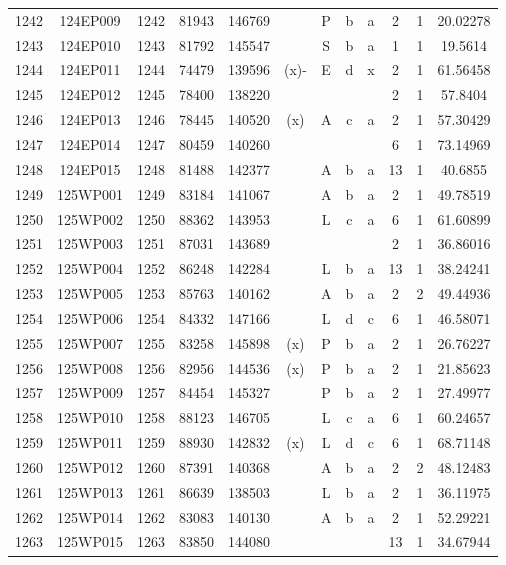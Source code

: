 \begin{tabular}{|*{12}{c|}}
1242 & 124EP009 & 1242 & 81943 & 146769 &  & P & b & a & 2 & 1 & 20.02278 \\ 
1243 & 124EP010 & 1243 & 81792 & 145547 &  & S & b & a & 1 & 1 & 19.5614 \\ 
1244 & 124EP011 & 1244 & 74479 & 139596 & (x)- & E & d & x & 2 & 1 & 61.56458 \\ 
1245 & 124EP012 & 1245 & 78400 & 138220 &  &  &  &  & 2 & 1 & 57.8404 \\ 
1246 & 124EP013 & 1246 & 78445 & 140520 & (x) & A & c & a & 2 & 1 & 57.30429 \\ 
1247 & 124EP014 & 1247 & 80459 & 140260 &  &  &  &  & 6 & 1 & 73.14969 \\ 
1248 & 124EP015 & 1248 & 81488 & 142377 &  & A & b & a & 13 & 1 & 40.6855 \\ 
1249 & 125WP001 & 1249 & 83184 & 141067 &  & A & b & a & 2 & 1 & 49.78519 \\ 
1250 & 125WP002 & 1250 & 88362 & 143953 &  & L & c & a & 6 & 1 & 61.60899 \\ 
1251 & 125WP003 & 1251 & 87031 & 143689 &  &  &  &  & 2 & 1 & 36.86016 \\ 
1252 & 125WP004 & 1252 & 86248 & 142284 &  & L & b & a & 13 & 1 & 38.24241 \\ 
1253 & 125WP005 & 1253 & 85763 & 140162 &  & A & b & a & 2 & 2 & 49.44936 \\ 
1254 & 125WP006 & 1254 & 84332 & 147166 &  & L & d & c & 6 & 1 & 46.58071 \\ 
1255 & 125WP007 & 1255 & 83258 & 145898 & (x) & P & b & a & 2 & 1 & 26.76227 \\ 
1256 & 125WP008 & 1256 & 82956 & 144536 & (x) & P & b & a & 2 & 1 & 21.85623 \\ 
1257 & 125WP009 & 1257 & 84454 & 145327 &  & P & b & a & 2 & 1 & 27.49977 \\ 
1258 & 125WP010 & 1258 & 88123 & 146705 &  & L & c & a & 6 & 1 & 60.24657 \\ 
1259 & 125WP011 & 1259 & 88930 & 142832 & (x) & L & d & c & 6 & 1 & 68.71148 \\ 
1260 & 125WP012 & 1260 & 87391 & 140368 &  & A & b & a & 2 & 2 & 48.12483 \\ 
1261 & 125WP013 & 1261 & 86639 & 138503 &  & L & b & a & 2 & 1 & 36.11975 \\ 
1262 & 125WP014 & 1262 & 83083 & 140130 &  & A & b & a & 2 & 1 & 52.29221 \\ 
1263 & 125WP015 & 1263 & 83850 & 144080 &  &  &  &  & 13 & 1 & 34.67944 \\ 

\end{tabular}
